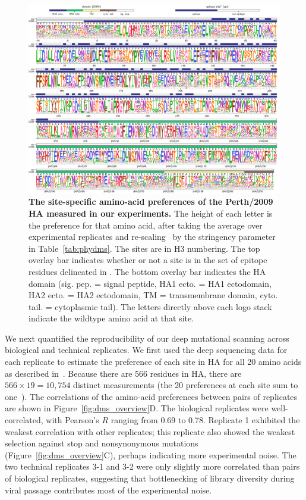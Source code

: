\documentclass[9pt,twocolumn,twoside]{pnas-new}
\begin{document}
\begin{figure}[ht]
\centering
\includegraphics[width=17cm]{figs/prefslogoplot/rescaled-avgprefs_prefs.pdf}
\caption{\label{fig:logoplot}
{\bf The site-specific amino-acid preferences of the Perth/2009 HA measured in our experiments.}
The height of each letter is the preference for that amino acid, after taking the average over experimental replicates and re-scaling~\cite{hilton2017phydms} by the stringency parameter in Table~\ref{tab:phydms}.
The sites are in H3 numbering.
The top overlay bar indicates whether or not a site is in the set of epitope residues delineated in \cite{wolf2006long}.
The bottom overlay bar indicates the HA domain (sig. pep. = signal peptide, HA1 ecto. = HA1 ectodomain, HA2 ecto. = HA2 ectodomain, TM = transmembrane domain, cyto. tail. = cytoplasmic tail).
The letters directly above each logo stack indicate the wildtype amino acid at that site.
}
\end{figure}

We next quantified the reproducibility of our deep mutational scanning across biological and technical replicates.
We first used the deep sequencing data for each replicate to estimate the preference of each site in HA for all 20 amino acids as described in~\cite{bloom2015software}.
Because there are 566 residues in HA, there are $566 \times 19 = 10,754$ distinct measurements (the 20 preferences at each site sum to one~\cite{bloom2015software}).
The correlations of the amino-acid preferences between pairs of replicates are shown in Figure~\ref{fig:dms_overview}D.
The biological replicates were well-correlated, with Pearson's $R$ ranging from 0.69 to 0.78.
Replicate 1 exhibited the weakest correlation with other replicates; this replicate also showed the weakest selection against stop and nonsynonymous mutations (Figure~\ref{fig:dms_overview}C), perhaps indicating more experimental noise.
The two technical replicates 3-1 and 3-2 were only slightly more correlated than pairs of biological replicates, suggesting that bottlenecking of library diversity during viral passage contributes most of the experimental noise.
\end{document}
